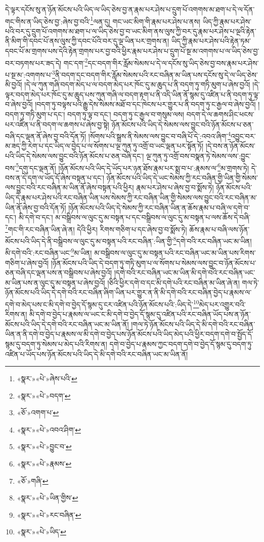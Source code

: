 དེ་ལྟར་དངོས་སུ་ན་ཉོན་མོངས་པའི་ཡིད་ལ་ཡིད་ཅེས་བྱ་ན་རྣམ་པར་ཤེས་པ་དྲུག་པོ་འགགས་མ་ཐག་པ་དེ་ལ་དོན་གང་གིས་ན་ཡིད་ཅེས་བྱ་:ཞེས་བྱ་བའི་\footnote{«སྣར་»«པེ་»ཞེས་པའི་}ལན་དུ། གང་ཡང་མིག་གི་རྣམ་པར་ཤེས་པ་ནས། ཡིད་ཀྱི་རྣམ་པར་ཤེས་པའི་བར་དུ་དྲུག་པོ་འགགས་མ་ཐག་པ་ལ་ཡིད་ཅེས་བྱ་བ་ཡང་མིག་ནས་ལུས་ཀྱི་བར་དུ་རྣམ་པར་ཤེས་པ་ལྔའི་རྟེན་ནི་མིག་གི་དབང་པོ་ནས་ལུས་ཀྱི་དབང་པོའི་བར་དུ་ལྔ་ཡིན་པར་གྲགས་ན། ཡིད་ཀྱི་རྣམ་པར་ཤེས་པའི་རྟེན་ཏམ་དབང་པོ་མ་གྲགས་པས་དེའི་རྟེན་གྲགས་པར་བྱ་བའི་ཕྱིར་རྣམ་པར་ཤེས་པ་དྲུག་པོ་སྔ་མ་འགགས་པ་ལ་ཡིད་ཅེས་བྱ་བར་བཏགས་པར་ཟད་དེ། གང་དག་\footnote{«སྣར་»«པེ་»བདག་}དང་བདག་གིར་རློམ་སེམས་པ་དེ་ལ་དངོས་སུ་ཡིད་ཅེས་བྱ་བས་རྣམ་པར་ཤེས་པ་སྔ་མ་:འགགས་པ་\footnote{«ཅོ་»འགག་པ་}ནི་བདག་དང་བདག་གིར་རློམ་སེམས་པའི་རང་བཞིན་མ་ཡིན་པས་དངོས་སུ་དེ་ལ་ཡིད་ཅེས་མི་བྱའོ། །དེ་ལ་ཀུན་གཞི་བདག་མེད་པ་ལ་བདག་མེད་པར་ཁོང་དུ་མ་ཆུད་པ་ནི་བདག་ཏུ་གཏི་མུག་པ་ཞེས་བྱའོ། །དེ་ལྟར་བདག་མེད་པར་ཁོང་དུ་མ་ཆུད་པས་ཀུན་གཞི་ལ་བདག་རྟག་པ་ནི་འདི་ཡིན་ནོ་སྙམ་དུ་འཛིན་པ་ནི་བདག་ཏུ་ལྟ་བ་ཞེས་བྱའོ། །བདག་ཏུ་བལྟས་པའི་རྒྱུ་དེས་སེམས་མཐོ་བ་དང་ཁེངས་པར་གྱུར་པ་ནི་བདག་ཏུ་ང་རྒྱལ་བ་ཞེས་བྱའོ། །བདག་ཏུ་གཏི་མུག་པ་དང་། བདག་ཏུ་ལྟ་བ་དང་། བདག་ཏུ་ང་རྒྱལ་བ་གསུམ་ལས། བདག་དེ་ལ་ཆགས་ཤིང་ཕངས་པར་འཛིན་པ་ནི་བདག་ལ་ཆགས་པ་ཞེས་བྱ་སྟེ། ཉོན་མོངས་པའི་ཡིད་དེ་སེམས་ལས་བྱུང་བའི་ཉོན་མོངས་པ་ཅན་བཞི་དང་ལྡན་ནོ་ཞེས་བྱ་བའི་དོན་ཏོ། །སོགས་པའི་སྒྲས་ནི་སེམས་ལས་བྱུང་བ་བཞི་པོ་དེ་:འབའ་ཞིག་\footnote{«སྣར་»«པེ་»འབའ་ཤིག་}འབྱུང་བར་མ་ཟད་ཀྱི་རེག་པ་དང་ཡིད་ལ་བྱེད་པ་ལ་སོགས་པ་ལྔ་ཀུན་ཏུ་འགྲོ་བ་ཡང་ལྡན་པར་སྟོན་ཏོ། །དེ་བས་ན་ཉོན་མོངས་པའི་ཡིད་དེ་སེམས་ལས་བྱུང་བའི་ཉོན་མོངས་པ་ཅན་བཞི་དང་། ལྔ་ཀུན་ཏུ་འགྲོ་བས་བསྣན་ཏེ་སེམས་ལས་:བྱུང་བས་\footnote{«སྣར་»«པེ་»བྱུང་བ་}དགུ་དང་ལྡན་ནོ། །ཉོན་མོངས་པའི་ཡིད་དེ་ཡོད་པར་ཉན་ཐོས་རྣམ་པར་སྨྲ་བ་པ་:རྣམས་ལ་\footnote{«སྣར་»«པེ་»རྣམས་}མ་གྲགས་ཏེ། དེ་བས་ན་དེ་དག་ལ་ཡོད་དོ་ཞེས་བསྟན་པ་དང་། ཉོན་མོངས་པའི་ཡིད་དེ་ཡང་སེམས་ཀྱི་རང་བཞིན་གྱི་ཡིན་གྱི་སེམས་ལས་བྱུང་བའི་རང་བཞིན་མ་ཡིན་ནོ་ཞེས་བསྟན་པའི་ཕྱིར། རྣམ་པར་ཤེས་པ་ཞེས་བྱ་བ་སྨོས་ཏེ། ཉོན་མོངས་པའི་ཡིད་དེ་རྣམ་པར་ཤེས་པའི་རང་བཞིན་ཡིན་པས་སེམས་ཀྱི་རང་བཞིན་ཡིན་གྱི་སེམས་ལས་བྱུང་བའི་རང་བཞིན་མ་ཡིན་ནོ་ཞེས་བྱ་བའི་དོན་ཏོ། །ཉོན་མོངས་པའི་ཡིད་དེ་སེམས་ཀྱི་རང་བཞིན་ཡིན་ན་ཆོས་རྣམ་པ་བཞི་ལ་དགེ་བ་དང་། མི་དགེ་བ་དང་། མ་བསྒྲིབས་ལ་ལུང་དུ་མ་བསྟན་པ་དང་བསྒྲིབས་ལ་ལུང་དུ་མ་བསྟན་པ་ལས་ཆོས་དེ་བཞི་\footnote{«ཅོ་»གཞི་}གང་གི་རང་བཞིན་ཡིན་ཞེ་ན། དེའི་ཕྱིར། རིགས་གཅིག་པ་དང་ཞེས་བྱ་བ་སྨོས་ཏེ། ཆོས་རྣམ་པ་བཞི་ལས་ཉོན་མོངས་པའི་ཡིད་དེ་ནི་བསྒྲིབས་ལ་ལུང་དུ་མ་བསྟན་པའི་རང་བཞིན་:ཡིན་གྱི་\footnote{«སྣར་»«པེ་»ཡིན་གྱིས་}དགེ་བའི་རང་བཞིན་ཡང་མ་ཡིན། མི་དགེ་བའི་:རང་བཞིན་ཡང་\footnote{«སྣར་»«པེ་»རང་བཞིན་}མ་ཡིན། མ་བསྒྲིབས་ལ་ལུང་དུ་མ་བསྟན་པའི་རང་བཞིན་ཡང་མ་ཡིན་པས་རིགས་གཅིག་པ་ཞེས་བྱའོ། །ཉོན་མོངས་པའི་ཡིད་དེ་བདག་ཏུ་གཏི་མུག་པ་ལ་སོགས་པ་སེམས་ལས་བྱུང་བ་ཉོན་མོངས་པ་ཅན་བཞི་དང་ལྡན་པས་ན་བསྒྲིབས་པ་ཞེས་བྱའོ། །དགེ་བའི་རང་བཞིན་ཡང་མ་ཡིན་མི་དགེ་བའི་རང་བཞིན་ཡང་མ་ཡིན་པས་ན་ལུང་དུ་མ་བསྟན་པ་ཞེས་བྱའོ། །ཅིའི་ཕྱིར་དགེ་བ་དང་མི་དགེ་པའི་རང་བཞིན་མ་ཡིན་ཞེ་ན། གལ་ཏེ་ཉོན་མོངས་པའི་ཡིད་དེ་དགེ་བའི་རང་བཞིན་ཞིག་ཡིན་པར་གྱུར་ན་ནི་མི་དགེ་བའི་རང་བཞིན་བྱེད་པ་རྣམས་ལ་དགེ་བ་མེད་པས་ང་མི་དགེ་བ་བྱེད་དོ་སྙམ་དུ་ངར་འཛིན་པའི་ཉོན་མོངས་པའི་:ཡིད་དེ་\footnote{«སྣར་»«པེ་»ཡིད་}མེད་པར་འགྱུར་བའི་རིགས་ན། མི་དགེ་བ་བྱེད་པ་རྣམས་ལ་ཡང་ང་མི་དགེ་བ་བྱེད་དོ་སྙམ་དུ་འཛིན་པའི་རང་བཞིན་ཡོད་པས་ན་ཉོན་མོངས་པའི་ཡིད་དེ་དགེ་བའི་རང་བཞིན་ཡང་མ་ཡིན་ནོ། །གལ་ཏེ་ཉོན་མོངས་པའི་ཡིད་དེ་མི་དགེ་བའི་རང་བཞིན་ཡིན་ན་ནི་དགེ་བ་བྱེད་པ་རྣམས་ལ་མི་དགེ་བ་བྱེད་པས་ཉོན་མོངས་པའི་ཡིད་མེད་པའི་ཕྱིར་བདག་དགེ་བ་སྤྱོད་དོ་སྙམ་དུ་བདག་ཏུ་སེམས་པ་མེད་པའི་རིགས་ན། དགེ་བ་བྱེད་པ་རྣམས་ཀྱང་བདག་དགེ་བ་བྱེད་དོ་སྙམ་དུ་བདག་ཏུ་འཛིན་པ་ཡོད་པས་ཉོན་མོངས་པའི་ཡིད་དེ་མི་དགེ་བའི་རང་བཞིན་ཡང་མ་ཡིན་ནོ། 